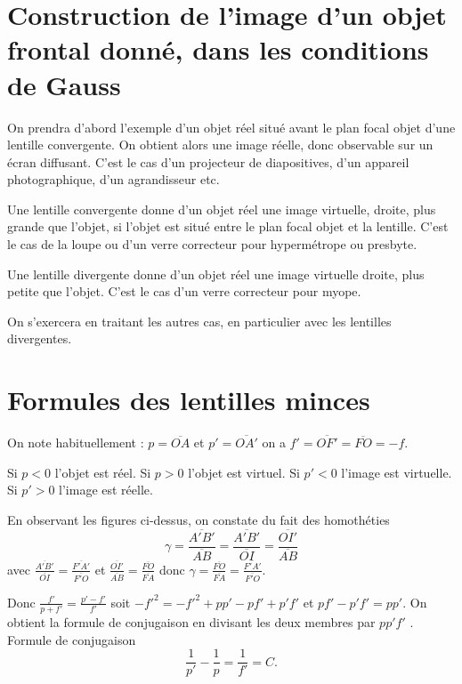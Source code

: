 \section{Construction de l'image d'un objet frontal donné, dans les conditions de Gauss}
\label{chap8-sec:constructionimagefrontal}

On prendra d'abord l'exemple d'un objet réel situé avant le plan focal objet d'une lentille convergente. On obtient alors une image réelle, donc observable sur un écran diffusant. C'est le cas d'un projecteur de diapositives, d'un appareil photographique, d'un agrandisseur etc.
%

Une lentille convergente donne d'un objet réel une image virtuelle, droite, plus grande que l'objet, si l'objet est situé entre le plan focal objet et la lentille. C'est le cas de la loupe ou d'un verre correcteur pour hypermétrope ou presbyte.

Une lentille divergente donne d'un objet  réel une image virtuelle droite, plus petite que l'objet. C'est le cas d'un verre correcteur pour myope.

On s'exercera en traitant les autres cas, en particulier avec les lentilles divergentes.

\section{Formules des lentilles minces}
\label{chap8-sec:formulesdeslentillesminces}
On note habituellement : \(p=\overline{OA}\) et \(p'=\overline{OA'}\) on a \(f'=\overline{OF'}=\overline{FO}=-f\).

Si \(p < 0\) l'objet est réel. Si \(p > 0\) l'objet est virtuel. Si \(p' < 0\) l'image est virtuelle. Si \(p' > 0\) l'image est réelle.

En observant les figures ci-dessus, on constate du fait des homothéties
\begin{equation}
  \gamma = \frac{\overline{A'B'}}{\overline{AB}} = \frac{\overline{A'B'}}{\overline{OI}} = \frac{\overline{OI'}}{\overline{AB}}
\end{equation}
 avec \(  \frac{\overline{A'B'}}{\overline{OI}} =  \frac{\overline{F'A'}}{\overline{F'O}}\) et \( \frac{\overline{OI'}}{\overline{AB}} = \frac{\overline{FO}}{\overline{FA}} \) donc \(\gamma = \frac{\overline{FO}}{\overline{FA}} = \frac{\overline{F'A'}}{\overline{F'O}}\).

Donc \(\frac{f'}{p+f'} = \frac{p'-f'}{f'}\) soit \(-f'^2 = -f'^2 + pp' - pf' + p'f'\)  et \(pf' - p'f' = pp'\). On obtient la formule de conjugaison en divisant les deux membres par \(pp'f'\) .
Formule de conjugaison
\begin{equation}
  \frac{1}{p'} - \frac{1}{p} = \frac{1}{f'} = C.
\end{equation}

